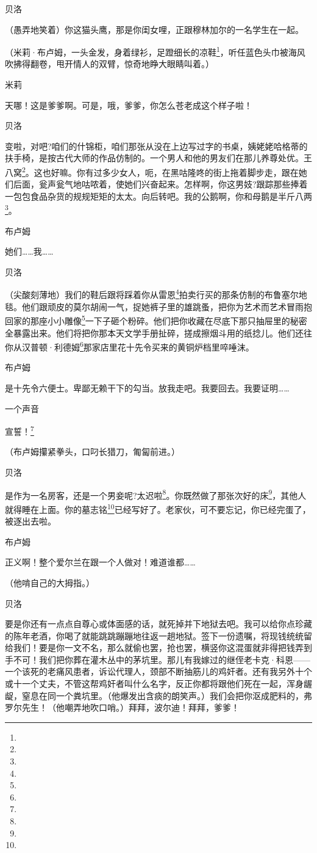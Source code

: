 \par 贝洛
\par （愚弄地笑着）你这猫头鹰，那是你闺女哩，正跟穆林加尔的一名学生在一起。
\par （米莉·布卢姆，一头金发，身着绿衫，足蹬细长的凉鞋\footnote{}，听任蓝色头巾被海风吹拂得翻卷，甩开情人的双臂，惊奇地睁大眼睛叫着。）
\par 米莉
\par 天哪！这是爹爹啊。可是，哦，爹爹，你怎么苍老成这个样子啦！
\par 贝洛
\par 变啦，对吧?咱们的什锦柜，咱们那张从没在上边写过字的书桌，姨姥姥哈格蒂的扶手椅，是按古代大师的作品仿制的。一个男人和他的男友们在那儿养尊处优。王八窝\footnote{}。这也好嘛。你有过多少女人，呃，在黑咕隆咚的街上拖着脚步走，跟在她们后面，瓮声瓮气地咕哝着，使她们兴奋起来。怎样啊，你这男妓?跟踪那些捧着一包包食品杂货的规规矩矩的太太。向后转吧。我的公鹅啊，你和母鹅是半斤八两\footnote{}。
\par 布卢姆
\par 她们……我……
\par 贝洛
\par （尖酸刻薄地）我们的鞋后跟将踩着你从雷恩\footnote{}拍卖行买的那条仿制的布鲁塞尔地毯。他们跟顽皮的莫尔胡闹一气，捉她裤子里的雄跳蚤，把你为艺术而艺术冒雨抱回家的那座小小雕像\footnote{}一下子砸个粉碎。他们把你收藏在尽底下那只抽屉里的秘密全暴露出来。他们将把你那本天文学手册扯碎，搓成擦烟斗用的纸捻儿。他们还往你从汉普顿·利德姆\footnote{}那家店里花十先令买来的黄铜炉档里啐唾沫。
\par 布卢姆
\par 是十先令六便士。卑鄙无赖干下的勾当。放我走吧。我要回去。我要证明……
\par 一个声音
\par 宣誓！\footnote{}
\par （布卢姆攥紧拳头，口叼长猎刀，匍匐前进。）
\par 贝洛
\par 是作为一名房客，还是一个男妾呢?太迟啦\footnote{}。你既然做了那张次好的床\footnote{}，其他人就得睡在上面。你的墓志铭\footnote{}已经写好了。老家伙，可不要忘记，你已经完蛋了，被逐出去啦。
\par 布卢姆
\par 正义啊！整个爱尔兰在跟一个人做对！难道谁都……
\par （他啃自己的大拇指。）
\par 贝洛
\par 要是你还有一点点自尊心或体面感的话，就死掉并下地狱去吧。我可以给你点珍藏的陈年老酒，你喝了就能跳跳蹦蹦地往返一趟地狱。签下一份遗嘱，将现钱统统留给我们！要是你一文不名，那么就偷也罢，抢也罢，横竖你这混蛋就非得把钱弄到手不可！我们把你葬在灌木丛中的茅坑里。那儿有我嫁过的继侄老卡克·科恩——一个该死的老痛风患者，诉讼代理人，颈部不断抽筋儿的鸡奸者。还有我另外十个或十一个丈夫，不管这帮鸡奸者叫什么名字，反正你都将跟他们死在一起，浑身龌龊，窒息在同一个粪坑里。（他爆发出含痰的朗笑声。）我们会把你沤成肥料的，弗罗尔先生！（他嘲弄地吹口哨。）拜拜，波尔迪！拜拜，爹爹！
